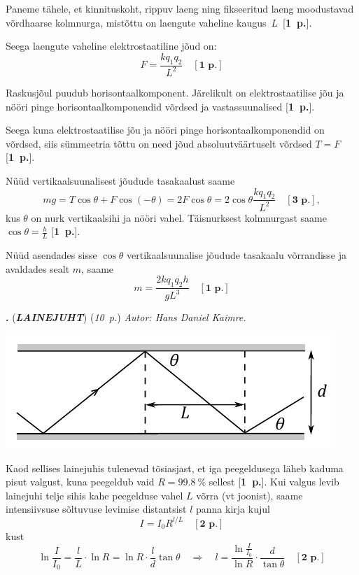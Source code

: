\documentclass[12pt,a5paper]{article}
\newcommand{\numb}[1]{\textbf{\large #1}}
\newcommand{\nimi}[1]{(\textsl{\small #1})}
\newcommand{\punktid}[1]{(\emph{#1~p.})}
\newcounter{ylesanne}
\newcommand{\yl}[1]{\addtocounter{ylesanne}{1}\newpage\numb{\theylesanne.} \nimi{\textbf{#1}} \newblock{}}
\newcommand{\pp}[1]{[\textbf{#1~p.}]}
\newcommand{\autor}[1]{\emph{ Autor: #1.\\}}
\begin{document}
Paneme tähele, et kinnituskoht, rippuv laeng ning fikseeritud laeng moodustavad võrdhaarse kolmnurga, mistõttu on laengute vaheline kaugus~$L$~\pp1.

Seega laengute vaheline elektrostaatiline jõud on:
$$F=\frac{kq_1q_2}{L^2} \quad \pp1$$

Raskusjõul puudub horisontaalkomponent. Järelikult on elektrostaatilise jõu ja nööri pinge horisontaalkomponendid võrdsed ja vastassuunalised \pp1.

Seega kuna elektrostaatilise jõu ja nööri pinge horisontaalkomponendid on võrdsed, siis sümmeetria tõttu on need jõud absoluutväärtuselt võrdsed $T=F$ \pp1.

Nüüd vertikaalsuunalisest jõudude tasakaalust saame
$$mg=T\cos\theta + F\cos (-\theta) = 2F\cos\theta = 2 \cos\theta \frac{kq_1q_2}{L^2} \quad \pp3,$$
kus $\theta$ on nurk vertikaalsihi ja nööri vahel.
Täisnurksest kolmnurgast saame $\cos\theta = \frac hL$ \pp1.

Nüüd asendades sisse $\cos\theta$ vertikaalsuunalise jõudude tasakaalu võrrandisse ja avaldades sealt $m$, saame
$$m=\frac{2kq_1q_2h}{gL^3} \quad \pp1$$

\yl{LAINEJUHT}\punktid{10}\autor{Hans Daniel Kaimre}
\begin{center}
\includegraphics[]{lainejuht_lah.pdf}
\end{center}

Kaod sellises lainejuhis tulenevad tõsiasjast, et iga peegeldusega läheb kaduma pisut valgust, kuna peegeldub vaid $R=\SI{99.8}{\percent}$ sellest \pp{1}. Kui valgus levib lainejuhi telje sihis kahe peegelduse vahel $L$ võrra (vt joonist), saame intensiivsuse sõltuvuse levimise distantsist $l$ panna kirja kujul
$$I=I_0 R^{l/L} \quad \pp{2}$$
kust
$$ \ln \frac{I}{I_0}=
\frac{l}{L}  \cdot \ln R=
\ln R \cdot\frac{l}{d}\tan\theta
\quad \Rightarrow \quad
l = \frac{\ln\frac{I}{I_0}}{\ln R}\cdot\frac{d}{\tan\theta}
\quad \pp{2}$$
\end{document}
